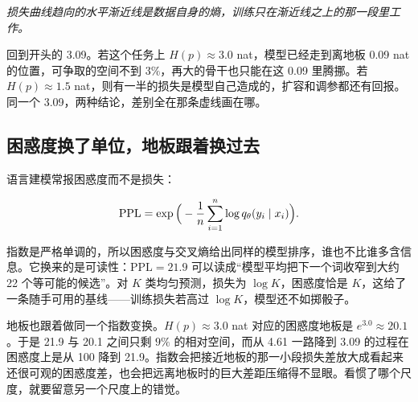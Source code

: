 \begin{center}
\end{center}

\emph{损失曲线趋向的水平渐近线是数据自身的熵，训练只在渐近线之上的那一段里工作。}

回到开头的 3.09。若这个任务上 \(H(p)\approx 3.0\) nat，模型已经走到离地板 0.09 nat 的位置，可争取的空间不到 \(3\%\)，再大的骨干也只能在这 0.09 里腾挪。若 \(H(p)\approx 1.5\) nat，则有一半的损失是模型自己造成的，扩容和调参都还有回报。同一个 3.09，两种结论，差别全在那条虚线画在哪。

\subsection{困惑度换了单位，地板跟着换过去}

语言建模常报困惑度而不是损失：

\[
\mathrm{PPL}=\exp\Big(-\frac1n\sum_{i=1}^n\log q_\theta(y_i\mid x_i)\Big).
\]

指数是严格单调的，所以困惑度与交叉熵给出同样的模型排序，谁也不比谁多含信息。它换来的是可读性：\(\mathrm{PPL}=21.9\) 可以读成``模型平均把下一个词收窄到大约 22 个等可能的候选''。对 \(K\) 类均匀预测，损失为 \(\log K\)，困惑度恰是 \(K\)，这给了一条随手可用的基线——训练损失若高过 \(\log K\)，模型还不如掷骰子。

地板也跟着做同一个指数变换。\(H(p)\approx 3.0\) nat 对应的困惑度地板是 \(e^{3.0}\approx 20.1\)。于是 21.9 与 20.1 之间只剩 \(9\%\) 的相对空间，而从 4.61 一路降到 3.09 的过程在困惑度上是从 100 降到 21.9。指数会把接近地板的那一小段损失差放大成看起来还很可观的困惑度差，也会把远离地板时的巨大差距压缩得不显眼。看惯了哪个尺度，就要留意另一个尺度上的错觉。

